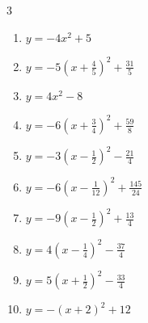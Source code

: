 \begin{multicols}{3}
\begin{enumerate}
\columnbreak %

  \item $\displaystyle y=-4x^{2}+5$

        \phantom{$\displaystyle 頂点\left( 0 , 5 \right)$}

  \item $\displaystyle y=-5\left( x+\frac{4}{5}\right)^{2}+\frac{31}{5}$


  \item $\displaystyle y=4x^{2}-8$

        \phantom{$\displaystyle 頂点\left( 0 , -8 \right)$}

  \item $\displaystyle y=-6\left( x+\frac{3}{4}\right)^{2}+\frac{59}{8}$


  \item $\displaystyle y=-3\left( x-\frac{1}{2}\right)^{2}-\frac{21}{4}$


  \item $\displaystyle y=-6\left( x-\frac{1}{12}\right)^{2}+\frac{145}{24}$


  \item $\displaystyle y=-9\left( x-\frac{1}{2}\right)^{2}+\frac{13}{4}$


  \item $\displaystyle y=4\left( x-\frac{1}{4}\right)^{2}-\frac{37}{4}$


  \item $\displaystyle y=5\left( x+\frac{1}{2}\right)^{2}-\frac{33}{4}$


  \item $\displaystyle y=-\left( x+2\right)^{2}+12$

        \phantom{$\displaystyle 頂点\left( -2 , 12 \right)$}


\end{enumerate}
\end{multicols}
